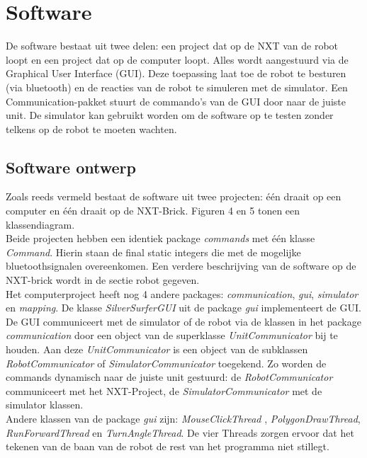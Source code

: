 \documentclass[tt3]{penoverslag}
\begin{document}
\section{Software} %
\label{sec:softw}
De software bestaat uit twee delen: een project dat op de NXT van de robot loopt en een project dat op de computer loopt. Alles wordt aangestuurd via de Graphical User Interface (GUI). Deze toepassing laat toe de robot te besturen (via bluetooth) en de reacties van de robot te simuleren met de simulator. Een Communication-pakket stuurt de commando's van de GUI door naar de juiste unit.
De simulator kan gebruikt worden om de software op te testen zonder telkens op de robot te moeten wachten.

\subsection{Software ontwerp} %
\label{ssec:Sdesign}
Zoals reeds vermeld bestaat de software uit twee projecten: \'e\'en draait op een computer en \'e\'en draait op de NXT-Brick. Figuren 4 en 5 tonen een klassendiagram.\\
Beide projecten hebben een identiek package \textit{commands} met \'e\'en klasse \textit{Command}. Hierin staan de final static integers die met de mogelijke bluetoothsignalen overeenkomen. Een verdere beschrijving van de software op de NXT-brick wordt in de sectie robot gegeven.\\


Het computerproject heeft nog 4 andere packages: \textit{communication}, \textit{gui}, \textit{simulator} en \textit{mapping}. 
De klasse \textit{SilverSurferGUI} uit de package \textit{gui} implementeert de GUI. De GUI communiceert met de simulator of de robot via de klassen in het package \textit{communication} door een object van de superklasse \textit{UnitCommunicator} bij te houden. Aan deze \textit{UnitCommunicator} is een object van de subklassen \textit{RobotCommunicator} of \textit{SimulatorCommunicator}  toegekend. Zo worden de commands dynamisch naar de juiste unit gestuurd: de \textit{RobotCommunicator} communiceert met het NXT-Project, de \textit{SimulatorCommunicator} met de simulator klassen.\\
Andere klassen van de package \textit{gui} zijn: \textit{MouseClickThread} , \textit{PolygonDrawThread}, \textit{RunForwardThread} en \textit{TurnAngleThread}. De vier Threads zorgen ervoor dat het tekenen van de baan van de robot de rest van het programma niet stillegt. \\
\end{document}
